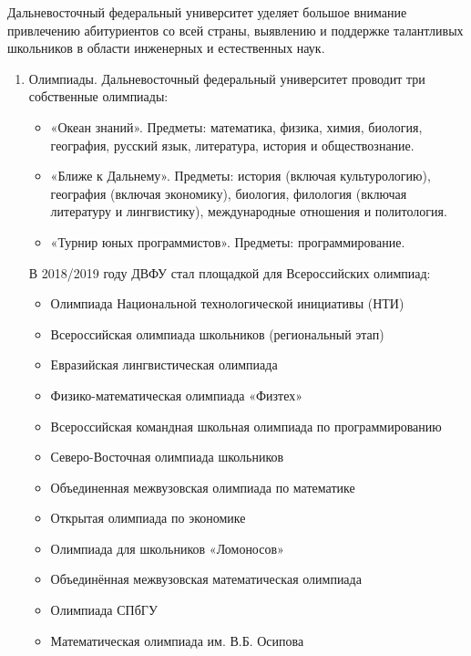Дальневосточный федеральный университет уделяет большое внимание привлечению абитуриентов со всей страны, выявлению и поддержке талантливых школьников в области инженерных и естественных наук.
\begin{enumerate}
    \item Олимпиады. Дальневосточный федеральный университет проводит три собственные олимпиады:
    \begin{itemize}
        \item «Океан знаний». Предметы: математика, физика, химия, биология, география, русский язык, литература, история и обществознание.
        \item «Ближе к Дальнему». Предметы: история (включая культурологию), география (включая экономику), биология, филология (включая литературу и лингвистику), международные отношения и политология.
        \item «Турнир юных программистов». Предметы: программирование.
    \end{itemize}

    В 2018/2019 году ДВФУ стал площадкой для Всероссийских олимпиад:
    \begin{itemize}
        \item Олимпиада Национальной технологической инициативы (НТИ)
        \item Всероссийская олимпиада школьников (региональный этап)
        \item Евразийская лингвистическая олимпиада
        \item Физико-математическая олимпиада «Физтех»
        \item Всероссийская командная школьная олимпиада по программированию
        \item Северо-Восточная олимпиада школьников
        \item Объединенная межвузовская олимпиада по математике
        \item Открытая олимпиада по экономике
        \item Олимпиада для школьников «Ломоносов»
        \item Объединённая межвузовская математическая олимпиада
        \item Олимпиада СПбГУ
        \item Математическая олимпиада им. В.Б. Осипова 
    \end{itemize}


\end{enumerate}
